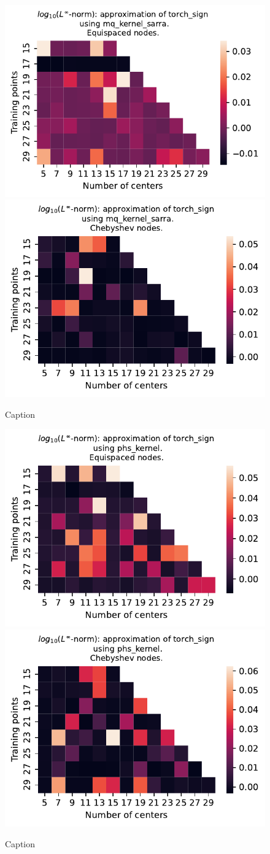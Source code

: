 \documentclass[12pt]{report} %
\begin{document}
\begin{figure}[ht]
    \centering
    
    \includegraphics[width=.49\textwidth]{imagenes/experiments/1d/variational/torch_sign-Kmq_kernel_sarra-Equi.pdf}
    \includegraphics[width=.49\textwidth]{imagenes/experiments/1d/variational/torch_sign-Kmq_kernel_sarra-Cheb.pdf}
    \caption{Caption}
    \label{fig:torch-sign-sarra}
\end{figure}


\begin{figure}[ht]
    \centering
    \includegraphics[width=.49\textwidth]{imagenes/experiments/1d/variational/torch_sign-Kphs_kernel-Equi.pdf}
    \includegraphics[width=.49\textwidth]{imagenes/experiments/1d/variational/torch_sign-Kphs_kernel-Cheb.pdf}
    \caption{Caption}
    \label{fig:torch-sign-phs}
\end{figure}
\end{document}
